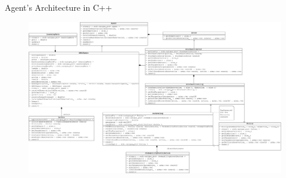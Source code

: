 \begin{frame}[c]{Agent's Architecture in C++}
	\begin{figure}[h]
		\centering
		\includegraphics[width=0.8\framewidth]{Images/agent_reduced}
	\end{figure}
\end{frame}

